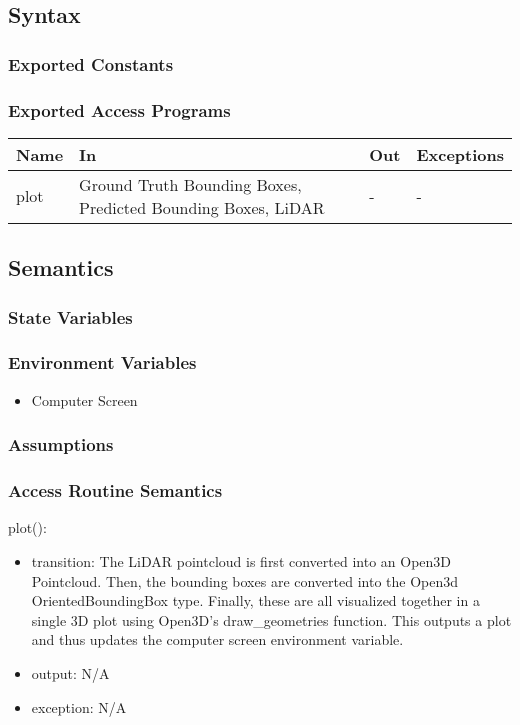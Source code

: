 \documentclass[12pt, titlepage]{article}
\begin{document}
\subsection{Syntax}



\subsubsection{Exported Constants}



\subsubsection{Exported Access Programs}

\begin{center}
\begin{tabular}{p{2cm}|p{6cm}|p{2cm}|p{2cm}}
\hline
\textbf{Name} & \textbf{In} & \textbf{Out} & \textbf{Exceptions} \\
\hline
plot & Ground Truth Bounding Boxes, Predicted Bounding Boxes, LiDAR & - & - \\
\hline
\end{tabular}
\end{center}

\subsection{Semantics}

\subsubsection{State Variables}

\subsubsection{Environment Variables}

\begin{itemize}
  \item Computer Screen
\end{itemize}

\subsubsection{Assumptions}



\subsubsection{Access Routine Semantics}
\noindent plot():
\begin{itemize}
\item transition: The LiDAR pointcloud is first converted into an Open3D Pointcloud. Then, the bounding boxes are converted into the Open3d OrientedBoundingBox type. Finally, these are all visualized together in a single 3D plot using Open3D's draw\_geometries function. This outputs a plot and thus updates the computer screen environment variable.
\item output: N/A
\item exception: N/A
\end{itemize}
\end{document}
